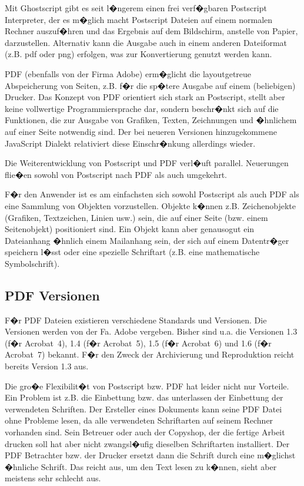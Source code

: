 Mit Ghostscript gibt es seit l�ngerem einen frei verf�gbaren Postscript Interpreter, der es m�glich macht Postscript Dateien auf einem normalen Rechner auszuf�hren und das Ergebnis auf dem Bildschirm, anstelle von Papier, darzustellen. Alternativ kann die Ausgabe auch in einem anderen Dateiformat (z.B. pdf oder png) erfolgen, was zur Konvertierung genutzt werden kann.

PDF (ebenfalls von der Firma Adobe) erm�glicht die layoutgetreue Abspeicherung von Seiten, z.B. f�r die sp�tere Ausgabe auf einem (beliebigen) Drucker. Das Konzept von PDF orientiert sich stark an Postscript, stellt aber keine vollwertige Programmiersprache dar, sondern beschr�nkt sich auf die Funktionen, die zur Ausgabe von Grafiken, Texten, Zeichnungen und �hnlichem auf einer Seite notwendig sind. Der bei neueren Versionen hinzugekommene JavaScript Dialekt relativiert diese Einschr�nkung allerdings wieder.

Die Weiterentwicklung von Postscript und PDF verl�uft parallel. Neuerungen flie�en sowohl von Postscript nach PDF als auch umgekehrt.

F�r den Anwender ist es am einfachsten sich sowohl Postscript als auch PDF als eine Sammlung von Objekten vorzustellen.
Objekte k�nnen z.B. Zeichenobjekte (Grafiken, Textzeichen, Linien usw.) sein, die auf einer Seite (bzw. einem Seitenobjekt) positioniert sind.
Ein Objekt kann aber genausogut ein Dateianhang �hnlich einem Mailanhang sein, der sich auf einem Datentr�ger speichern l�sst oder eine spezielle Schriftart (z.B. eine mathematische Symbolschrift).

\subsection{PDF Versionen\label{sec:pdfversionen}}
F�r PDF Dateien existieren verschiedene Standards und Versionen. Die Versionen werden von der Fa.
Adobe vergeben. Bisher sind u.a. die Versionen 1.3 (f�r Acrobat~4), 1.4 (f�r Acrobat~5), 1.5 (f�r Acrobat~6) und 1.6 (f�r Acrobat~7) bekannt. F�r den Zweck der Archivierung und Reproduktion reicht bereits Version 1.3 aus.

Die gro�e Flexibilit�t von Postscript bzw. PDF hat leider nicht nur Vorteile.
Ein Problem ist z.B. die Einbettung bzw. das unterlassen der Einbettung der verwendeten Schriften. Der Ersteller eines Dokuments kann seine PDF Datei ohne Probleme lesen, da alle verwendeten Schriftarten auf seinem Rechner vorhanden sind. Sein Betreuer oder auch der Copyshop, der die fertige Arbeit drucken soll hat aber nicht zwangsl�ufig dieselben Schriftarten installiert. Der PDF Betrachter bzw. der Drucker ersetzt dann die Schrift durch eine m�glichst �hnliche Schrift. Das reicht aus, um den Text lesen zu k�nnen, sieht aber meistens sehr schlecht aus.

